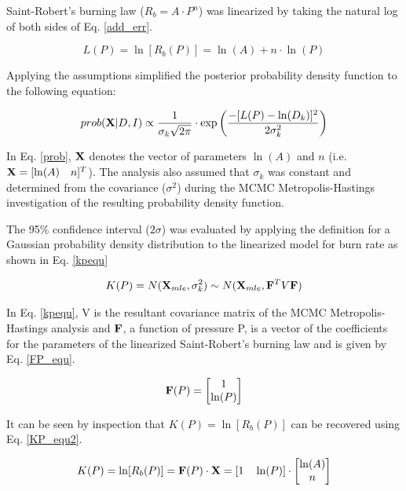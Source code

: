 \documentclass{article}
\begin{document}
Saint-Robert's burning law ($R_b=A \cdot P^n$) was linearized by taking the natural log of both sides of Eq. \ref{add_err}.

\begin{equation} \label{ln_st_rob}
L(P) = \ln [R_b(P)] = \ln (A) + n \cdot \ln (P)
\end{equation}

Applying the assumptions simplified the posterior probability density function to the following equation:

\begin{equation} \label{prob}
prob( \mathbf{X} |D, I) \propto \frac{1}{\sigma_k \sqrt{2 \pi} } \cdot \exp{\bigg( \frac{-[L(P)-\ln(D_k)]^2}{2\sigma_k^2} \bigg)}
\end{equation}

In Eq. \ref{prob}, $\mathbf{X}$ denotes the vector of parameters $\ln(A)$ and $n$ (i.e. $\mathbf{X}=[\ln(A) \quad n]^T$). 
The analysis also assumed that $\sigma_k$ was constant and determined from the covariance ($\sigma^2$) during the MCMC 
Metropolis-Hastings investigation of the resulting probability density function.

The 95\% confidence interval ($2\sigma$) was evaluated by applying the definition for a Gaussian probability density distribution 
to the linearized model for burn rate as shown in Eq. \ref{kpequ}

\begin{equation} \label{kpequ}
K(P)=N(\mathbf{X}_{mle},\sigma_k^2) \sim N(\mathbf{X}_{mle}, \mathbf{F}^T V \mathbf{F})
\end{equation}

In Eq. \ref{kpequ}, V is the resultant covariance matrix of the MCMC Metropolis-Hastings analysis and $\mathbf{F}$, a function of
pressure P, is a vector of the coefficients for the parameters of the linearized Saint-Robert's burning law and is given by
Eq. \ref{FP_equ}.

\begin{equation} \label{FP_equ}
\mathbf{F}(P)= 
\begin{bmatrix}
1 \\ 
\ln(P)
\end{bmatrix}
\end{equation}

It can be seen by inspection that $K(P) = \ln[R_b(P)]$ can be recovered using Eq. \ref{KP_equ2}.

\begin{equation} \label{KP_equ2}
K(P) = \ln[R_b(P)] = \mathbf{F}(P) \cdot \mathbf{X} = [1 \quad \ln(P)] \cdot 
\begin{bmatrix}
\ln(A) \\ 
n
\end{bmatrix}
\end{equation}
\end{document}
